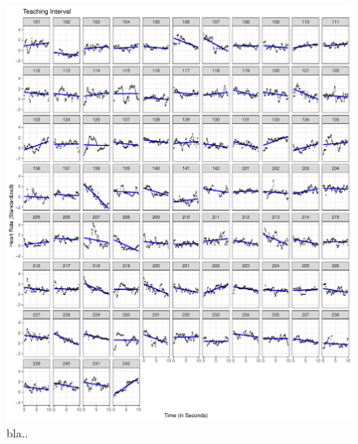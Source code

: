 \documentclass[preprint, 3p,
authoryear]{elsarticle} %
\begin{document}
\begin{figure}[htbp]
  \centering
  \includegraphics[width=1\textwidth]{plots_publication/plot_teaching_appendix.pdf}
  \caption{bla..}
  \label{teaching}
\end{figure}
\end{document}
